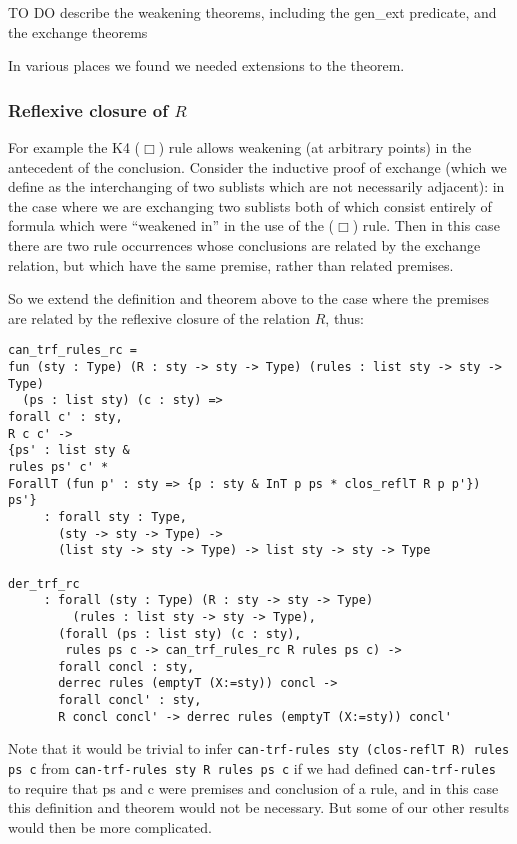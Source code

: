 \documentclass[a4paper,12pt]{llncs}
\begin{document}
TO DO describe the weakening theorems,
including the gen\_ext predicate,
and the exchange theorems

In various places we found we needed extensions to the theorem.

\subsubsection{Reflexive closure of $R$}\label{s-refl-clos}
For example the K4 ($\Box$) rule allows weakening (at arbitrary points)
in the antecedent of the conclusion.  
Consider the inductive proof of exchange (which we define as
the interchanging of two sublists which are not necessarily adjacent):
in the case where we are exchanging two sublists both of which consist entirely
of formula which were ``weakened in'' in the use of the ($\Box$) rule.
Then in this case there are two rule occurrences whose conclusions are related
by the exchange relation, but which have the same premise, rather than related
premises.

So we extend the definition and theorem above to the case where the 
premises are related by the reflexive closure of the relation $R$, thus:

\begin{theorem}\label{t-der-trf-rc}
\end{theorem}
\begin{verbatim}
can_trf_rules_rc = 
fun (sty : Type) (R : sty -> sty -> Type) (rules : list sty -> sty -> Type)
  (ps : list sty) (c : sty) =>
forall c' : sty,
R c c' ->
{ps' : list sty &
rules ps' c' *
ForallT (fun p' : sty => {p : sty & InT p ps * clos_reflT R p p'}) ps'}
     : forall sty : Type,
       (sty -> sty -> Type) ->
       (list sty -> sty -> Type) -> list sty -> sty -> Type

der_trf_rc
     : forall (sty : Type) (R : sty -> sty -> Type)
         (rules : list sty -> sty -> Type),
       (forall (ps : list sty) (c : sty),
        rules ps c -> can_trf_rules_rc R rules ps c) ->
       forall concl : sty,
       derrec rules (emptyT (X:=sty)) concl ->
       forall concl' : sty,
       R concl concl' -> derrec rules (emptyT (X:=sty)) concl'
\end{verbatim}

Note that it would be trivial to infer 
\texttt{can-trf-rules sty (clos-reflT R) rules ps c}
from \texttt{can-trf-rules sty R rules ps c}
if we had defined \texttt{can-trf-rules} to require that ps and c were
premises and conclusion of a rule, and in this case this definition and theorem
would not be necessary.  But some of our other results would then be more
complicated.
\end{document}
